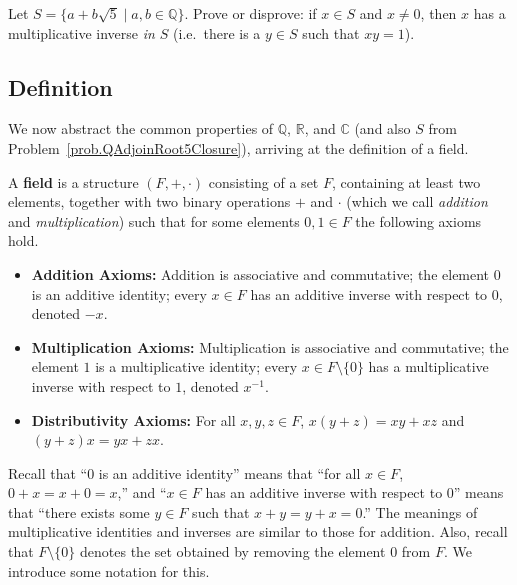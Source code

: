\begin{problem}\label{prob.QAdjoinRoot5Inverse}
Let $S=\{a+b\sqrt{5}\mid a,b\in \mathbb{Q}\}$. Prove or disprove: if $x\in S$ and $x\neq 0$, then $x$ has a multiplicative inverse \emph{in $S$} (i.e.~there is a $y\in S$ such that $xy=1$).
\end{problem}

\subsection{Definition}

We now abstract the common properties of $\mathbb{Q}$, $\mathbb{R}$, and $\mathbb{C}$ (and also $S$ from Problem~\ref{prob.QAdjoinRoot5Closure}), arriving at the definition of a field. 

\begin{definition}
A \textbf{field} is a structure $(F,+,\cdot)$ consisting of a set $F$, containing at least two elements, together with two binary operations $+$ and $\cdot$ (which we call \emph{addition} and \emph{multiplication}) such that for some elements $0,1\in F$ the following axioms hold.
\begin{itemize}
\item \textbf{Addition Axioms:} Addition is associative and commutative; the element $0$ is an additive identity; every  $x\in F$ has an additive inverse with respect to $0$, denoted $-x$.
\item \textbf{Multiplication Axioms:} Multiplication is associative and commutative; the element $1$ is a multiplicative identity;  every $x\in F\setminus\{0\}$ has a multiplicative inverse with respect to $1$, denoted $x^{-1}$.
\item \textbf{Distributivity Axioms:} For all $x,y,z \in F$, $x(y+z) = xy+xz$ and $(y+z)x = yx+zx$.
\end{itemize}
\end{definition}

Recall that ``$0$ is an additive identity'' means that ``for all $x\in F$, $0+x = x+0 = x$,'' and ``$x\in F$ has an additive inverse with respect to $0$'' means that ``there exists some $y\in F$ such that $x+y = y+x = 0$.'' The meanings of multiplicative identities and inverses are similar to those for addition. Also, recall that $F\setminus\{0\}$ denotes the set obtained by removing the element $0$ from $F$. We introduce some notation for this.

